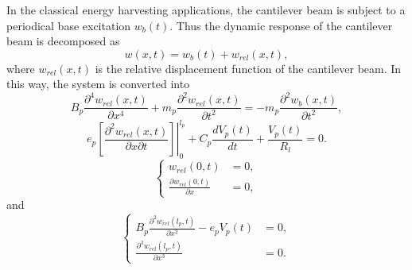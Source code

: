 \documentclass{article}
\begin{document}
In the classical energy harvesting applications, the cantilever beam is subject to a periodical base excitation $w_b(t)$. Thus the dynamic response of the cantilever beam is decomposed as 
\begin{equation}
    w(x,t) = w_b(t) + w_{rel}(x,t),
\end{equation}
where $w_{rel}(x,t)$ is the relative displacement function of the cantilever beam. In this way, the system is converted into 
\begin{equation}
    B_p \frac{\partial^4 w_{rel}(x,t)}{\partial x^4} + m_p \frac{\partial^2 w_{rel}(x,t)}{\partial t^2} = - m_p \frac{\partial^2 w_{b}(x,t)}{\partial t^2},
\end{equation}
\begin{equation}
    e_p \left.\left[ \frac{\partial^2 w_{rel}(x,t)}{\partial x \partial t}\right]\right|_0^{l_p} + C_p \frac{d V_p(t)}{d t} + \frac{V_p(t)}{R_l} = 0.
\end{equation}
\begin{equation}
    \left\{\begin{aligned}
        w_{rel}(0,t) &= 0, \\
        \frac{\partial w_{rel}(0,t)}{\partial x} &= 0,
    \end{aligned}\right.
\end{equation}
and
\begin{equation}
    \left\{\begin{aligned}
        B_p \frac{\partial^2 w_{rel}(l_p,t)}{\partial x^2} - e_p V_p(t) &= 0, \\
        \frac{\partial^3 w_{rel}(l_p,t)}{\partial x^3} &= 0.
    \end{aligned}\right.
\end{equation}
\end{document}

